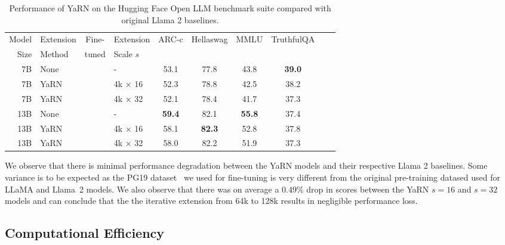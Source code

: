 \documentclass{article} %
\newcommand{\cmark}{\textcolor{green!80!black}{\ding{51}}}
\newcommand{\xmark}{\textcolor{red}{\ding{55}}}
\begin{document}
\begin{table}[h]
    \centering
    \begin{tabular}{rlclcccccc}
       \toprule
       Model & Extension & Fine- & Extension & \multirow{2}{*}{ARC-c} & \multirow{2}{*}{Hellaswag} & \multirow{2}{*}{MMLU} & \multirow{2}{*}{TruthfulQA}  \\
       Size & Method    & tuned & Scale $s$\\
       \midrule
        7B  & None          & \xmark &  -   & 53.1 & 77.8 & 43.8 & {\bf 39.0} \\
        7B & YaRN & \cmark & 4k $\times$ 16 & 52.3 & 78.8 & 42.5 & 38.2 \\
        7B & YaRN & \cmark & 4k $\times$ 32 & 52.1 & 78.4 & 41.7 & 37.3 \\
       \midrule
        13B & None          & \xmark &  -   & {\bf 59.4} & 82.1 & {\bf 55.8} & 37.4 \\
        13B & YaRN & \cmark & 4k $\times$ 16 & 58.1 & {\bf 82.3} & 52.8 & 37.8 \\
        13B & YaRN & \cmark & 4k $\times$ 32 & 58.0 & 82.2 & 51.9 & 37.3 \\
       \bottomrule
    \end{tabular}
    \caption{\small Performance of YaRN on the Hugging Face Open LLM benchmark suite compared with original Llama 2 baselines.}
    \label{tab:open_llm_128k}
\end{table}
We observe that there is minimal performance degradation between the YaRN models and their respective Llama 2 baselines. Some variance is to be expected as the PG19 dataset~\citep{Rae2020Compressive} we used for fine-tuning is very different from the original pre-training datased used for LLaMA and Llama~2 models.
We also observe that there was on average a 0.49\% drop in scores between the YaRN $s=16$ and $s=32$ models and can conclude that the the iterative extension from 64k to 128k results in negligible performance loss.

\subsection{Computational Efficiency}
\end{document}

